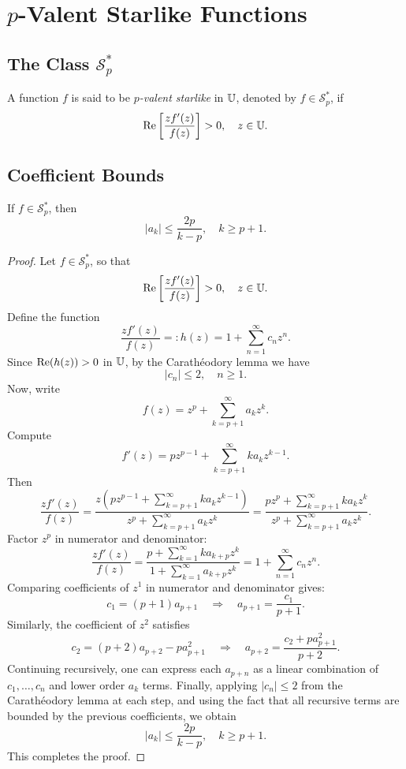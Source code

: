 \section{$p$-Valent Starlike Functions}

\subsection{The Class $\mathcal{S}_p^*$}

\begin{definition}
	A function $f$ is said to be \emph{$p$-valent starlike} in $\mathbb{U}$, denoted by $f \in \mathcal{S}_p^*$, if
	\[
	\operatorname{Re}\left[\frac{z f'(z)}{f(z)}\right] > 0,
	\quad z \in \mathbb{U}.
	\]
\end{definition}

\subsection{Coefficient Bounds}

\begin{theorem}\label{thm:coeff-starlike}
	If $f \in \mathcal{S}_p^*$, then
	\[
	|a_k| \le \frac{2p}{k-p}, \quad k \ge p+1.
	\]
\end{theorem}

\begin{proof}
	Let $f \in \mathcal{S}_p^*$, so that
	\[
	\operatorname{Re}\left[\frac{z f'(z)}{f(z)}\right] > 0, \quad z \in \mathbb{U}.
	\]
	Define the function
	\[
	\frac{z f'(z)}{f(z)} =: h(z) = 1 + \sum_{n=1}^{\infty} c_n z^n.
	\]
	Since $\operatorname{Re}(h(z))>0$ in $\mathbb{U}$, by the Carathéodory lemma we have
	\[
	|c_n| \le 2, \quad n \ge 1.
	\]
	Now, write
	\[
	f(z) = z^p + \sum_{k=p+1}^{\infty} a_k z^k.
	\]
	Compute
	\[
	f'(z) = p z^{p-1} + \sum_{k=p+1}^{\infty} k a_k z^{k-1}.
	\]
	Then
	\[
	\frac{z f'(z)}{f(z)} 
	= \frac{z \left( p z^{p-1} + \sum_{k=p+1}^{\infty} k a_k z^{k-1} \right)}{ z^p + \sum_{k=p+1}^{\infty} a_k z^k }
	= \frac{ p z^p + \sum_{k=p+1}^{\infty} k a_k z^k }{ z^p + \sum_{k=p+1}^{\infty} a_k z^k }.
	\]
	Factor $z^p$ in numerator and denominator:
	\[
	\frac{z f'(z)}{f(z)} = \frac{p + \sum_{k=1}^{\infty} k a_{k+p} z^k}{1 + \sum_{k=1}^{\infty} a_{k+p} z^k} = 1 + \sum_{n=1}^{\infty} c_n z^n.
	\]
	Comparing coefficients of $z^1$ in numerator and denominator gives:
	\[
	c_1 = (p+1) a_{p+1} \quad \Rightarrow \quad a_{p+1} = \frac{c_1}{p+1}.
	\]
	Similarly, the coefficient of $z^2$ satisfies
	\[
	c_2 = (p+2) a_{p+2} - p a_{p+1}^2 \quad \Rightarrow \quad a_{p+2} = \frac{c_2 + p a_{p+1}^2}{p+2}.
	\]
	Continuing recursively, one can express each $a_{p+n}$ as a linear combination of $c_1, \dots, c_n$ and lower order $a_k$ terms.  
	Finally, applying $|c_n| \le 2$ from the Carathéodory lemma at each step, and using the fact that all recursive terms are bounded by the previous coefficients, we obtain
	\[
	|a_k| \le \frac{2p}{k-p}, \quad k \ge p+1.
	\]
	This completes the proof.
\end{proof}



